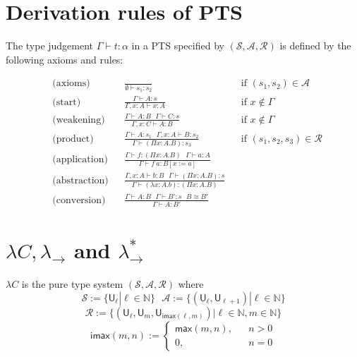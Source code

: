 \appendix
\section{Derivation rules of PTS}\label{apppts}

  The type judgement $\Gamma \vdash t : \alpha$ in a PTS specified
  by $(\mathcal{S}, \mathcal{A}, \mathcal{R})$ is defined by the following
  axioms and rules:

  $$\begin{aligned}
    & \text{(axioms)}      & & \frac{}{\emptyset \vdash s_1 : s_2} & & \text{if } (s_1, s_2) \in \mathcal{A} \\
    & \text{(start)}       & & \frac{\Gamma \vdash A : s}{\Gamma, x : A \vdash x : A} & & \text{if } x \notin \Gamma \\
    & \text{(weakening)}   & & \frac{\Gamma \vdash A : B \ \ \ \Gamma \vdash C : s}{\Gamma, x : C \vdash A : B} & & \text{if } x \notin \Gamma \\
    & \text{(product)}     & & \frac{\Gamma \vdash A : s_1 \ \ \ \Gamma, x : A \vdash B : s_2}{\Gamma \vdash (\Pi x : A. B) : s_3} & & \text{if } (s_1, s_2, s_3) \in \mathcal{R} \\
    & \text{(application)} & & \frac{\Gamma \vdash f : (\Pi x : A. B) \ \ \ \Gamma \vdash a : A}{\Gamma \vdash f \ a : B[x := a]} & & \\
    & \text{(abstraction)} & & \frac{\Gamma, x : A \vdash b : B \ \ \ \Gamma \vdash (\Pi x : A. B) : s}{\Gamma \vdash (\lambda x : A.b) : (\Pi x : A. B)} & & \\
    & \text{(conversion)}  & & \frac{\Gamma \vdash A : B \ \ \ \Gamma \vdash B' : s \ \ \ B \cong B'}{\Gamma \vdash A : B'} & &
  \end{aligned}$$

\section{$\lambda C, \lambda_\to$ and $\lambda_\to^*$}\label{applll}

  \begin{definition} $\lambda C$ is the pure type system $(\mathcal{S}, \mathcal{A}, \mathcal{R})$ where
    $$\mathcal{S} := \{\mathsf{U}_\ell | \ell \in \mathbb{N}\} \ \ \ \mathcal{A} := \{(\mathsf{U}_\ell, \mathsf{U}_{\ell + 1}) | \ell \in \mathbb{N}\}$$
    $$\mathcal{R} := \{(\mathsf{U}_\ell, \mathsf{U}_m, \mathsf{U}_{\mathsf{imax}(\ell, m)}) | \ell \in \mathbb{N}, m \in \mathbb{N}\}$$
    $$\mathsf{imax}(m, n) := \left\{\begin{aligned}
      \mathsf{max}(m, n), & & n > 0 \\
      0, & & n = 0
    \end{aligned}\right.$$
  \end{definition}
  
